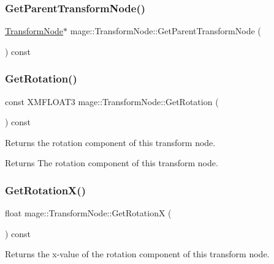 \subsubsection{\texorpdfstring{Get\+Parent\+Transform\+Node()}{GetParentTransformNode()}}
{\footnotesize\ttfamily \hyperlink{classmage_1_1_transform_node}{Transform\+Node}$\ast$ mage\+::\+Transform\+Node\+::\+Get\+Parent\+Transform\+Node (\begin{DoxyParamCaption}{ }\end{DoxyParamCaption}) const}

\hypertarget{classmage_1_1_transform_node_a59853c7e8a8cd049a8e6362986204409}{}\label{classmage_1_1_transform_node_a59853c7e8a8cd049a8e6362986204409} 
\subsubsection{\texorpdfstring{Get\+Rotation()}{GetRotation()}}
{\footnotesize\ttfamily const X\+M\+F\+L\+O\+A\+T3 mage\+::\+Transform\+Node\+::\+Get\+Rotation (\begin{DoxyParamCaption}{ }\end{DoxyParamCaption}) const}

Returns the rotation component of this transform node.

\begin{DoxyReturn}{Returns}
The rotation component of this transform node. 
\end{DoxyReturn}
\hypertarget{classmage_1_1_transform_node_a2b3d032c45a0de8d128db83664d85111}{}\label{classmage_1_1_transform_node_a2b3d032c45a0de8d128db83664d85111} 
\subsubsection{\texorpdfstring{Get\+Rotation\+X()}{GetRotationX()}}
{\footnotesize\ttfamily float mage\+::\+Transform\+Node\+::\+Get\+RotationX (\begin{DoxyParamCaption}{ }\end{DoxyParamCaption}) const}

Returns the x-\/value of the rotation component of this transform node.

